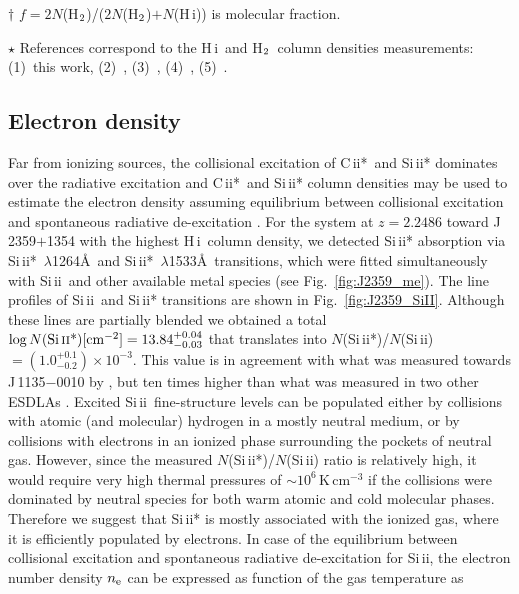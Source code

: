 \documentclass[fleqn,usenatbib,useAMS]{mnras}
\newcommand{\HH}{\mbox{H$\rm _2$}}
\newcommand{\HI}{H\,{\sc i}}
\newcommand{\CII}{C\,{\sc ii}}
\newcommand{\SiII}{Si\,{\sc ii}}
\begin{document}
\begin{table*}
\begin{tabular}{ccccccccc}
\hline
\end{tabular}
\begin{tablenotes}
\item
$\dagger$ $f=2N$(\HH)/($2N$(\HH)$+N$(\HI)) is molecular fraction.
\item 
$\star$ References correspond to the \HI\ and \HH\ column densities measurements: (1)~this work, (2)~\citet{Ranjan2020}, (3)~\citet{Balashev2017}, (4)~\citet{Noterdaeme2007b}, (5)~\citet{Noterdaeme2008}.
\end{tablenotes}
\end{table*}
\renewcommand\arraystretch{1}



\subsection{Electron density}
\label{sec:eden}
Far from ionizing sources, the collisional excitation of \CII*\ and \SiII* dominates over the radiative excitation and
\CII*\ and \SiII* column densities may be used to estimate the electron density assuming equilibrium between collisional excitation and spontaneous radiative de-excitation \citep{Srianand2000}.
For the system at $z=2.2486$ toward J\,2359$+$1354 with the highest \HI\ column density, we detected \SiII* absorption via \SiII*~$\lambda$1264\AA\ and \SiII*~$\lambda$1533\AA\ transitions, which were fitted simultaneously with \SiII\ and other available metal species (see Fig.~\ref{fig:J2359_me}). The line profiles of \SiII\ and \SiII* transitions are shown in Fig.~\ref{fig:J2359_SiII}.
Although these lines are partially blended we obtained a total $\log N({\rm \text{\SiII*}})\text{[cm$^{-2}$]}=13.84^{+0.04}_{-0.03}$ that translates into $N$(\SiII*)/$N$(\SiII)$=\left(1.0^{+0.1}_{-0.2}\right)\times10^{-3}$. This value is in agreement with what was measured towards J\,1135$-$0010 by \citet{Kulkarni2012}, but ten times higher than what was measured in two other ESDLAs \citep{Noterdaeme2015, Balashev2017}. Excited \SiII\ fine-structure levels can be populated either by collisions with atomic (and molecular) hydrogen in a mostly neutral medium, or by collisions with electrons in an ionized phase surrounding the pockets of neutral gas. However, since the measured $N$(\SiII*)/$N$(\SiII) ratio is relatively high, it would require very high thermal pressures of $\sim10^6$\,K\,cm$^{-3}$ if the collisions were dominated by neutral species for both warm atomic and cold molecular phases. Therefore we suggest that \SiII* is mostly associated with the ionized gas, where it is efficiently populated by electrons. In case of the equilibrium between collisional excitation and spontaneous radiative de-excitation for \SiII, the electron number density $n_{\rm e}$ can be expressed as function of the gas temperature as
\end{document}
